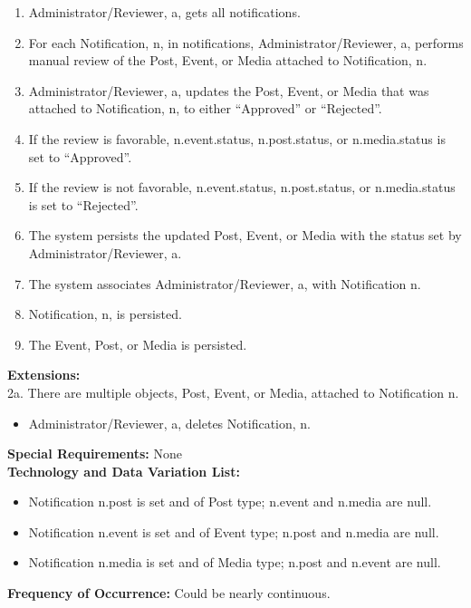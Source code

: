\documentclass{article}
\begin{document}
\begin{enumerate}
    \item Administrator/Reviewer, a, gets all notifications.
    \item For each Notification, n, in notifications, Administrator/Reviewer, a, performs manual review of the Post, Event, or Media attached to Notification, n.
    \item Administrator/Reviewer, a, updates the Post, Event, or Media that was attached to Notification, n, to either “Approved” or “Rejected”.
    \item If the review is favorable, n.event.status, n.post.status, or n.media.status is set to “Approved”.
    \item If the review is not favorable, n.event.status, n.post.status, or n.media.status is set to “Rejected”.
    \item The system persists the updated Post, Event, or Media with the status set by Administrator/Reviewer, a.
    \item The system associates Administrator/Reviewer, a, with Notification n.
    \item Notification, n, is persisted.
    \item The Event, Post, or Media is persisted.
\end{enumerate}
\textbf{Extensions:} \\
2a. There are multiple objects, Post, Event, or Media, attached to Notification n.
\begin{itemize}
    \item Administrator/Reviewer, a, deletes Notification, n.
\end{itemize}
\textbf{Special Requirements:} None \\
\textbf{Technology and Data Variation List:}
\begin{itemize}
    \item Notification n.post is set and of Post type; n.event and n.media are null.
    \item Notification n.event is set and of Event type; n.post and n.media are null.
    \item Notification n.media is set and of Media type; n.post and n.event are null.
\end{itemize}
\textbf{Frequency of Occurrence:} Could be nearly continuous. \\
\end{document}

